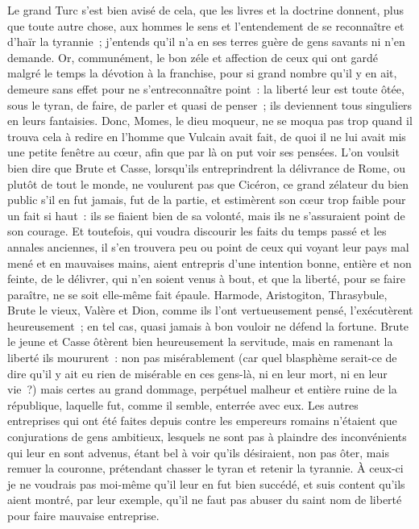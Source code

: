 \documentclass[french,twoside]{book} %
\begin{document}
Le grand Turc s’est bien avisé de cela, que les livres et la doctrine donnent, plus que toute autre chose, aux hommes le sens et l’entendement de se reconnaître et d’haïr la tyrannie ; j’entends qu’il n’a en ses terres guère de gens savants ni n’en demande. Or, communément, le bon zéle et affection de ceux qui ont gardé malgré le temps la dévotion à la franchise, pour si grand nombre qu’il y en ait, demeure sans effet pour ne s’entreconnaître point : la liberté leur est toute ôtée, sous le tyran, de faire, de parler et quasi de penser ; ils deviennent tous singuliers en leurs fantaisies. Donc, Momes, le dieu moqueur, ne se moqua pas trop quand il trouva cela à redire en l’homme que Vulcain avait fait, de quoi il ne lui avait mis une petite fenêtre au cœur, afin que par là on put voir ses pensées. L’on voulsit bien dire que Brute et Casse, lorsqu’ils entreprindrent la délivrance de Rome, ou plutôt de tout le monde, ne voulurent pas que Cicéron, ce grand zélateur du bien public s’il en fut jamais, fut de la partie, et estimèrent son cœur trop faible pour un fait si haut : ils se fiaient bien de sa volonté, mais ils ne s’assuraient point de son courage. Et toutefois, qui voudra discourir les faits du temps passé et les annales anciennes, il s’en trouvera peu ou point de ceux qui voyant leur pays mal mené et en mauvaises mains, aient entrepris d’une intention bonne, entière et non feinte, de le délivrer, qui n’en soient venus à bout, et que la liberté, pour se faire paraître, ne se soit elle-même fait épaule. Harmode, Aristogiton, Thrasybule, Brute le vieux, Valère et Dion, comme ils l’ont vertueusement pensé, l’exécutèrent heureusement ; en tel cas, quasi jamais à bon vouloir ne défend la fortune. Brute le jeune et Casse ôtèrent bien heureusement la servitude, mais en ramenant la liberté ils moururent : non pas misérablement (car quel blasphème serait-ce de dire qu’il y ait eu rien de misérable en ces gens-là, ni en leur mort, ni en leur vie ?) mais certes au grand dommage, perpétuel malheur et entière ruine de la république, laquelle fut, comme il semble, enterrée avec eux. Les autres entreprises qui ont été faites depuis contre les empereurs romains n’étaient que conjurations de gens ambitieux, lesquels ne sont pas à plaindre des inconvénients qui leur en sont advenus, étant bel à voir qu’ils désiraient, non pas ôter, mais remuer la couronne, prétendant chasser le tyran et retenir la tyrannie. À ceux-ci je ne voudrais pas moi-même qu’il leur en fut bien succédé, et suis content qu’ils aient montré, par leur exemple, qu’il ne faut pas abuser du saint nom de liberté pour faire mauvaise entreprise.\par
\end{document}
